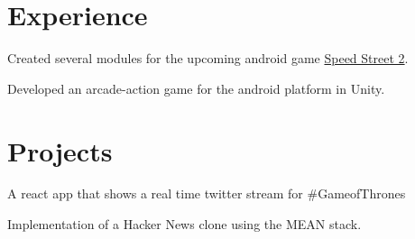 \documentclass[a4paper]{resume}
\begin{document}
\begin{minipage}[t]{0.66\textwidth} %


\section{Experience}


\vspace{\topsep} %
\begin{tightitemize}
\item Created several modules for the upcoming android game {\href{https://play.google.com/store/apps/details?id=com.firexit.speedstreet2VRdemo}{Speed Street 2}}.
\item Developed an arcade-action game for the android platform in Unity.
\end{tightitemize}

\sectionspace %


\section{Projects}



\begin{tightitemize}
\item A react app that shows a real time twitter stream for \#GameofThrones
\end{tightitemize}

\sectionspace %




\begin{tightitemize}
\item Implementation of a Hacker News clone using the MEAN stack.
\end{tightitemize}


\end{minipage}
\end{document}
